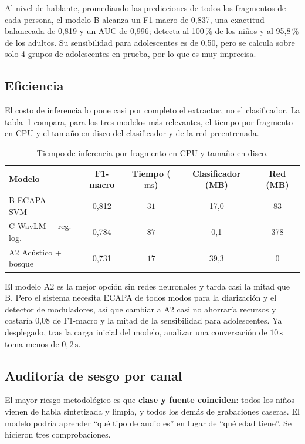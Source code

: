 \documentclass[11pt,a4paper]{article}
\begin{document}
Al nivel de hablante, promediando las predicciones de todos los fragmentos de cada persona, el modelo B alcanza un F1-macro de 0,837, una exactitud balanceada de 0,819 y un AUC de 0,996; detecta al 100\,\% de los niños y al 95,8\,\% de los adultos. Su sensibilidad para adolescentes es de 0,50, pero se calcula sobre solo 4 grupos de adolescentes en prueba, por lo que es muy imprecisa.

\subsection{Eficiencia}

El costo de inferencia lo pone casi por completo el extractor, no el clasificador. La tabla~\ref{tab:eficiencia} compara, para los tres modelos más relevantes, el tiempo por fragmento en CPU y el tamaño en disco del clasificador y de la red preentrenada.

\begin{table}[H]
\centering
\caption{Tiempo de inferencia por fragmento en CPU y tamaño en disco.}
\label{tab:eficiencia}
\small
\begin{tabular}{@{}lcccc@{}}
\toprule
\textbf{Modelo} & \textbf{F1-macro} & \textbf{Tiempo ($\mathrm{ms}$)} & \textbf{Clasificador (MB)} & \textbf{Red (MB)} \\
\midrule
B ECAPA + SVM         & 0,812 & $31$ & 17,0 & 83 \\
C WavLM + reg. log.   & 0,784 & $87$ & 0,1 & 378 \\
A2 Acústico + bosque  & 0,731 & $17$ & 39,3 & 0 \\
\bottomrule
\end{tabular}
\end{table}

El modelo A2 es la mejor opción sin redes neuronales y tarda casi la mitad que B. Pero el sistema necesita ECAPA de todos modos para la diarización y el detector de moduladores, así que cambiar a A2 casi no ahorraría recursos y costaría 0,08 de F1-macro y la mitad de la sensibilidad para adolescentes. Ya desplegado, tras la carga inicial del modelo, analizar una conversación de $10\,\mathrm{s}$ toma menos de $0{,}2\,\mathrm{s}$.

\subsection{Auditoría de sesgo por canal}
\label{sec:sesgo}

El mayor riesgo metodológico es que \textbf{clase y fuente coinciden}: todos los niños vienen de habla sintetizada y limpia, y todos los demás de grabaciones caseras. El modelo podría aprender ``qué tipo de audio es'' en lugar de ``qué edad tiene''. Se hicieron tres comprobaciones.
\end{document}

